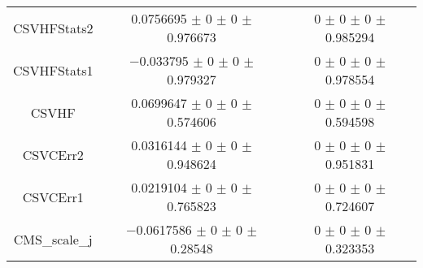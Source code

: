 \begin{table}
\begin{tabular}{ccc}
CSVHFStats2 	& \num{0.0756695} $\pm$ \num{0} $\pm$ \num{0} $\pm$ \num{0.976673} 	& \num{0} $\pm$ \num{0} $\pm$ \num{0} $\pm$ \num{0.985294}\\
CSVHFStats1 	& \num{-0.033795} $\pm$ \num{0} $\pm$ \num{0} $\pm$ \num{0.979327} 	& \num{0} $\pm$ \num{0} $\pm$ \num{0} $\pm$ \num{0.978554}\\
CSVHF 	& \num{0.0699647} $\pm$ \num{0} $\pm$ \num{0} $\pm$ \num{0.574606} 	& \num{0} $\pm$ \num{0} $\pm$ \num{0} $\pm$ \num{0.594598}\\
CSVCErr2 	& \num{0.0316144} $\pm$ \num{0} $\pm$ \num{0} $\pm$ \num{0.948624} 	& \num{0} $\pm$ \num{0} $\pm$ \num{0} $\pm$ \num{0.951831}\\
CSVCErr1 	& \num{0.0219104} $\pm$ \num{0} $\pm$ \num{0} $\pm$ \num{0.765823} 	& \num{0} $\pm$ \num{0} $\pm$ \num{0} $\pm$ \num{0.724607}\\
CMS\_scale\_j 	& \num{-0.0617586} $\pm$ \num{0} $\pm$ \num{0} $\pm$ \num{0.28548} 	& \num{0} $\pm$ \num{0} $\pm$ \num{0} $\pm$ \num{0.323353}\\
\bottomrule
\end{tabular}
\end{table}